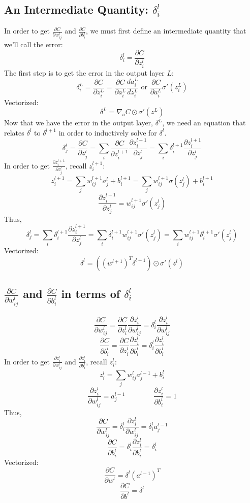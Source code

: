 \documentclass[11pt]{article}
\begin{document}
\subsection{An Intermediate Quantity: $\delta_i^l$}
In order to get $\frac{\partial C}{\partial w_{ij}^l}$ and $\frac{\partial C}{\partial b_i^l}$, we must first define an intermediate quantity that we'll call the error:
\[\delta_i^l = \frac{\partial C}{\partial z_i^l}\]
The first step is to get the error in the output layer $L$:
\[\delta_i^L = \frac{\partial C}{\partial z_i^L} = \frac{\partial C}{\partial a_i^L} \frac{d a_i^L}{d z_i^L} \text{ or } \frac{\partial C}{\partial a_i^L} \sigma'(z_i^L)\]
Vectorized:
\[\delta^L = \nabla_a C \odot \sigma'(z^L)\]
Now that we have the error in the output layer, $\delta^L$, we need an equation that relates $\delta^l$ to $\delta^{l + 1}$ in order to inductively solve for $\delta^l$.
\[\delta_j^l = \frac{\partial C}{\partial z_j^l} = \sum_i \frac{\partial C}{\partial z_i^{l + 1}} \frac{\partial z_i^{l + 1}}{\partial z_j^l} = \sum_i \delta_i^{l + 1} \frac{\partial z_i^{l + 1}}{\partial z_j^l}\]
In order to get $\frac{\partial z_i^{l + 1}}{\partial z_j^l}$, recall $z_i^{l + 1}$:
\[z_i^{l + 1} = \sum_j w_{ij}^{l + 1} a_j^l + b_i^{l + 1} = \sum_j w_{ij}^{l + 1} \sigma(z_j^l) + b_i^{l + 1}\]
\[\frac{\partial z_i^{l + 1}}{\partial z_j^l} = w_{ij}^{l + 1} \sigma'(z_j^l)\]
Thus,
\[\delta_j^l = \sum_i \delta_i^{l + 1} \frac{\partial z_i^{l + 1}}{\partial z_j^l} = \sum_i \delta_i^{l + 1} w_{ij}^{l + 1} \sigma'(z_j^l) = \sum_i w_{ij}^{l + 1} \delta_i^{l + 1} \sigma'(z_j^l)\]
Vectorized:
\[\delta^l = \left(\left(w^{l + 1}\right)^T \delta^{l + 1}\right) \odot \sigma'(z^l)\]

\subsection{$\frac{\partial C}{\partial w_{ij}^l}$ and $\frac{\partial C}{\partial b_i^l}$ in terms of $\delta_i^l$}

\[\frac{\partial C}{\partial w_{ij}^l} = \frac{\partial C}{\partial z_i^l} \frac{\partial z_i^l}{\partial w_{ij}^l} = \delta_i^l \frac{\partial z_i^l}{\partial w_{ij}^l}\]
\[\frac{\partial C}{\partial b_i^l} = \frac{\partial C}{\partial z_i^l} \frac{\partial z_i^l}{\partial b_i^l} = \delta_i^l \frac{\partial z_i^l}{\partial b_i^l}\]
In order to get $\frac{\partial z_i^l}{\partial w_{ij}^l}$ and $\frac{\partial z_i^l}{\partial b_i^l}$, recall $z_i^l$:
\[z_i^l = \sum_j w_{ij}^l a_j^{l - 1} + b_i^l\]
\[\frac{\partial z_i^l}{\partial w_{ij}^l} = a_j^{l - 1}
\qquad \qquad 
\frac{\partial z_i^l}{\partial b_i^l} = 1\]
Thus,
\[\frac{\partial C}{\partial w_{ij}^l} = \delta_i^l \frac{\partial z_i^l}{\partial w_{ij}^l} = \delta_i^l a_j^{l - 1}\]
\[\frac{\partial C}{\partial b_i^l} = \delta_i^l \frac{\partial z_i^l}{\partial b_i^l} = \delta_i^l\]
Vectorized:
\[\frac{\partial C}{\partial w^l} = \delta^l \left(a^{l - 1}\right)^T\]
\[\frac{\partial C}{\partial b^l} = \delta^l\]
\end{document}
